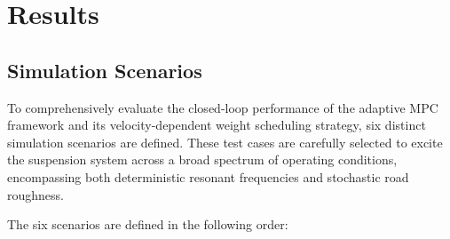 \chapter{Results}\label{chap:results}
\section{Simulation Scenarios}
\label{subsec:sim_scenarios}

To comprehensively evaluate the closed-loop performance of the adaptive MPC framework and its velocity-dependent weight scheduling strategy, six distinct simulation scenarios are defined. These test cases are carefully selected to excite the suspension system across a broad spectrum of operating conditions, encompassing both deterministic resonant frequencies and stochastic road roughness.

The six scenarios are defined in the following order:

